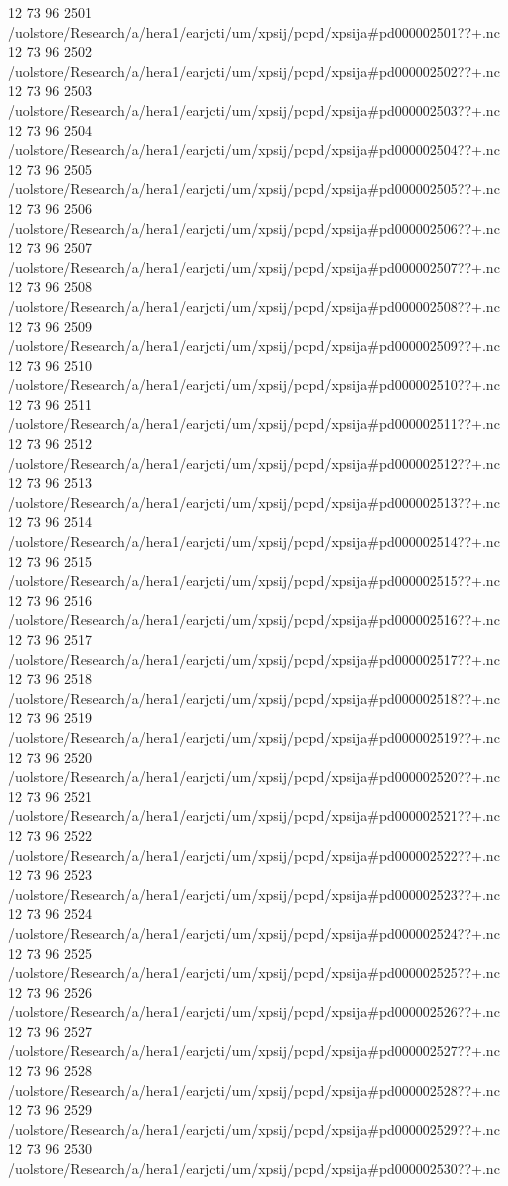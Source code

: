 12 73 96
2501
/uolstore/Research/a/hera1/earjcti/um/xpsij/pcpd/xpsija#pd000002501??+.nc
12 73 96
2502
/uolstore/Research/a/hera1/earjcti/um/xpsij/pcpd/xpsija#pd000002502??+.nc
12 73 96
2503
/uolstore/Research/a/hera1/earjcti/um/xpsij/pcpd/xpsija#pd000002503??+.nc
12 73 96
2504
/uolstore/Research/a/hera1/earjcti/um/xpsij/pcpd/xpsija#pd000002504??+.nc
12 73 96
2505
/uolstore/Research/a/hera1/earjcti/um/xpsij/pcpd/xpsija#pd000002505??+.nc
12 73 96
2506
/uolstore/Research/a/hera1/earjcti/um/xpsij/pcpd/xpsija#pd000002506??+.nc
12 73 96
2507
/uolstore/Research/a/hera1/earjcti/um/xpsij/pcpd/xpsija#pd000002507??+.nc
12 73 96
2508
/uolstore/Research/a/hera1/earjcti/um/xpsij/pcpd/xpsija#pd000002508??+.nc
12 73 96
2509
/uolstore/Research/a/hera1/earjcti/um/xpsij/pcpd/xpsija#pd000002509??+.nc
12 73 96
2510
/uolstore/Research/a/hera1/earjcti/um/xpsij/pcpd/xpsija#pd000002510??+.nc
12 73 96
2511
/uolstore/Research/a/hera1/earjcti/um/xpsij/pcpd/xpsija#pd000002511??+.nc
12 73 96
2512
/uolstore/Research/a/hera1/earjcti/um/xpsij/pcpd/xpsija#pd000002512??+.nc
12 73 96
2513
/uolstore/Research/a/hera1/earjcti/um/xpsij/pcpd/xpsija#pd000002513??+.nc
12 73 96
2514
/uolstore/Research/a/hera1/earjcti/um/xpsij/pcpd/xpsija#pd000002514??+.nc
12 73 96
2515
/uolstore/Research/a/hera1/earjcti/um/xpsij/pcpd/xpsija#pd000002515??+.nc
12 73 96
2516
/uolstore/Research/a/hera1/earjcti/um/xpsij/pcpd/xpsija#pd000002516??+.nc
12 73 96
2517
/uolstore/Research/a/hera1/earjcti/um/xpsij/pcpd/xpsija#pd000002517??+.nc
12 73 96
2518
/uolstore/Research/a/hera1/earjcti/um/xpsij/pcpd/xpsija#pd000002518??+.nc
12 73 96
2519
/uolstore/Research/a/hera1/earjcti/um/xpsij/pcpd/xpsija#pd000002519??+.nc
12 73 96
2520
/uolstore/Research/a/hera1/earjcti/um/xpsij/pcpd/xpsija#pd000002520??+.nc
12 73 96
2521
/uolstore/Research/a/hera1/earjcti/um/xpsij/pcpd/xpsija#pd000002521??+.nc
12 73 96
2522
/uolstore/Research/a/hera1/earjcti/um/xpsij/pcpd/xpsija#pd000002522??+.nc
12 73 96
2523
/uolstore/Research/a/hera1/earjcti/um/xpsij/pcpd/xpsija#pd000002523??+.nc
12 73 96
2524
/uolstore/Research/a/hera1/earjcti/um/xpsij/pcpd/xpsija#pd000002524??+.nc
12 73 96
2525
/uolstore/Research/a/hera1/earjcti/um/xpsij/pcpd/xpsija#pd000002525??+.nc
12 73 96
2526
/uolstore/Research/a/hera1/earjcti/um/xpsij/pcpd/xpsija#pd000002526??+.nc
12 73 96
2527
/uolstore/Research/a/hera1/earjcti/um/xpsij/pcpd/xpsija#pd000002527??+.nc
12 73 96
2528
/uolstore/Research/a/hera1/earjcti/um/xpsij/pcpd/xpsija#pd000002528??+.nc
12 73 96
2529
/uolstore/Research/a/hera1/earjcti/um/xpsij/pcpd/xpsija#pd000002529??+.nc
12 73 96
2530
/uolstore/Research/a/hera1/earjcti/um/xpsij/pcpd/xpsija#pd000002530??+.nc
